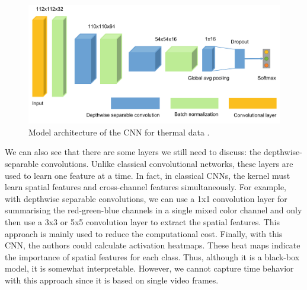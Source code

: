 \begin{figure}
    \centering
    \includegraphics[scale=0.5]{Images/CNN residual heat.png}
    \caption[CNN for residual heat.]{Model architecture of the CNN for thermal data \cite{baumgartl_deep_2020}.}
    \label{fig:cnnresidual}
\end{figure}
We can also see that there are some layers we still need to discuss: the depthwise-separable convolutions. Unlike classical convolutional networks, these layers are used to learn one feature at a time. In fact, in classical CNNs, the kernel must learn spatial features and cross-channel features simultaneously. For example, with depthwise separable convolutions, we can use a 1x1 convolution layer for summarising the red-green-blue channels in a single mixed color channel and only then use a 3x3 or 5x5 convolution layer to extract the spatial features. This approach is mainly used to reduce the computational cost. Finally, with this CNN, the authors could calculate activation heatmaps. These heat maps indicate the importance of spatial features for each class. Thus, although it is a black-box model, it is somewhat interpretable. However, we cannot capture time behavior with this approach since it is based on single video frames.

